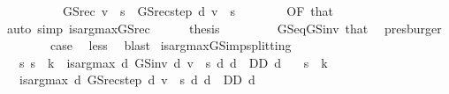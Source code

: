 \begin{isabellebody}
\ \ \isamarkupfalse%
\ {\isacharminus}{\kern0pt}\isanewline
\ \ \ \ \isamarkupfalse%
\ {\isachardoublequoteopen}GS{\isacharunderscore}{\kern0pt}rec\ v\ {\isachardollar}{\kern0pt}\ s\ {\isacharequal}{\kern0pt}\ GS{\isacharunderscore}{\kern0pt}rec{\isacharunderscore}{\kern0pt}step\ d\ v\ {\isachardollar}{\kern0pt}\ s{\isachardoublequoteclose}\isanewline
\ \ \ \ \ \ \isamarkupfalse%
\ {\isacharasterisk}{\kern0pt}{\isacharbrackleft}{\kern0pt}OF\ that{\isacharbrackright}{\kern0pt}\isanewline
\ \ \ \ \ \ \isamarkupfalse%
\ {\isacharparenleft}{\kern0pt}auto\ simp{\isacharcolon}{\kern0pt}\ is{\isacharunderscore}{\kern0pt}arg{\isacharunderscore}{\kern0pt}max{\isacharunderscore}{\kern0pt}GS{\isacharunderscore}{\kern0pt}rec{\isacharprime}{\kern0pt}{\isacharparenright}{\kern0pt}\isanewline
\ \ \ \ \isamarkupfalse%
\ {\isacharquery}{\kern0pt}thesis\isanewline
\ \ \ \ \ \ \isamarkupfalse%
\ {\isacharasterisk}{\kern0pt}\ GS{\isacharunderscore}{\kern0pt}eq{\isacharunderscore}{\kern0pt}GS{\isacharunderscore}{\kern0pt}inv\ that\ \isamarkupfalse%
\ presburger\isanewline
\ \ \isamarkupfalse%
\isanewline
\ \ \isamarkupfalse%
\ \isamarkupfalse%
\ {\isacharquery}{\kern0pt}case\ \isamarkupfalse%
\ less\ \isamarkupfalse%
\ blast\isanewline
{}\isamarkupfalse%
%
\endisatagproof
{\isafoldproof}%
%
\isadelimproof
\isanewline
%
\endisadelimproof
\isanewline
{}\isamarkupfalse%
\ is{\isacharunderscore}{\kern0pt}arg{\isacharunderscore}{\kern0pt}max{\isacharunderscore}{\kern0pt}GS{\isacharunderscore}{\kern0pt}imp{\isacharunderscore}{\kern0pt}splitting{\isacharprime}{\kern0pt}{\isacharprime}{\kern0pt}{\isacharprime}{\kern0pt}{\isacharcolon}{\kern0pt}\isanewline
\ \ \ {\isachardoublequoteopen}{\isasymAnd}s{\isachardot}{\kern0pt}\ s\ {\isasymle}\ k\ {\isasymLongrightarrow}\ is{\isacharunderscore}{\kern0pt}arg{\isacharunderscore}{\kern0pt}max\ {\isacharparenleft}{\kern0pt}{\isasymlambda}d{\isachardot}{\kern0pt}\ GS{\isacharunderscore}{\kern0pt}inv\ d\ v\ {\isachardollar}{\kern0pt}\ s{\isacharparenright}{\kern0pt}\ {\isacharparenleft}{\kern0pt}{\isasymlambda}d{\isachardot}{\kern0pt}\ d\ {\isasymin}\ D\isactrlsub D{\isacharparenright}{\kern0pt}\ d{\isachardoublequoteclose}\isanewline
\ \ \ {\isachardoublequoteopen}s\ {\isasymle}\ k{\isachardoublequoteclose}\isanewline
\ \ \ {\isachardoublequoteopen}is{\isacharunderscore}{\kern0pt}arg{\isacharunderscore}{\kern0pt}max\ {\isacharparenleft}{\kern0pt}{\isasymlambda}d{\isachardot}{\kern0pt}\ GS{\isacharunderscore}{\kern0pt}rec{\isacharunderscore}{\kern0pt}step\ d\ v\ {\isachardollar}{\kern0pt}\ s{\isacharparenright}{\kern0pt}\ {\isacharparenleft}{\kern0pt}{\isasymlambda}d{\isachardot}{\kern0pt}\ d\ {\isasymin}\ D\isactrlsub D{\isacharparenright}{\kern0pt}\ d{\isachardoublequoteclose}\isanewline

\end{isabellebody}
